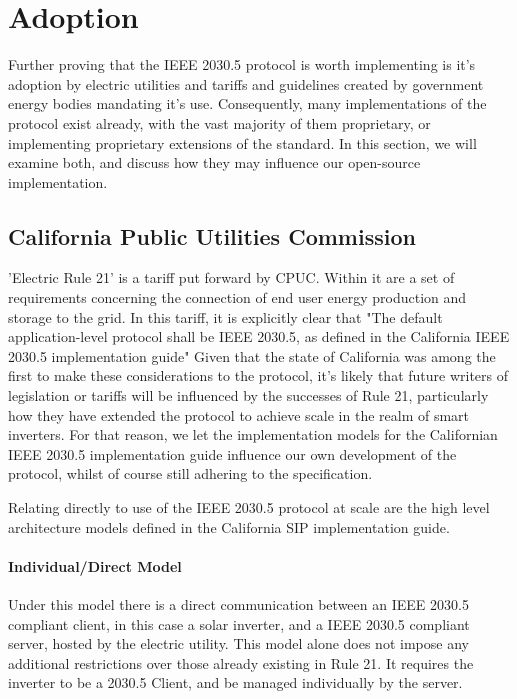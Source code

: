 \chapter{Adoption}\label{ch:adoption}

Further proving that the IEEE 2030.5 protocol is worth implementing is it's adoption by electric utilities and tariffs and guidelines created by government energy bodies mandating it's use.
Consequently, many implementations of the protocol exist already, with the vast majority of them proprietary, or implementing proprietary extensions of the standard.
In this section, we will examine both, and discuss how they may influence our open-source implementation. 

\section{California Public Utilities Commission}
'Electric Rule 21' is a tariff put forward by CPUC. Within it are a set of requirements concerning the connection of end user energy production and storage to the grid. In this tariff, it is explicitly clear that
"The default application-level protocol shall be IEEE 2030.5, as defined in the California IEEE 2030.5 implementation guide" \cite[]{Rule21}
Given that the state of California was among the first to make these considerations to the protocol, it's likely that future writers of legislation or tariffs will be influenced by the successes of Rule 21, particularly how they have extended the protocol to achieve scale in the realm of smart inverters.
For that reason, we let the implementation models for the Californian IEEE 2030.5 implementation guide influence our own development of the protocol, whilst of course still adhering to the specification.

Relating directly to use of the IEEE 2030.5 protocol at scale are the high level architecture models defined in the California SIP implementation guide.

\subsubsection{Individual/Direct Model}
Under this model there is a direct communication between an IEEE 2030.5 compliant client, in this case a solar inverter, and a IEEE 2030.5 compliant server, hosted by the electric utility.
This model alone does not impose any additional restrictions over those already existing in Rule 21. It requires the inverter to be a 2030.5 Client, and be managed individually by the server.


